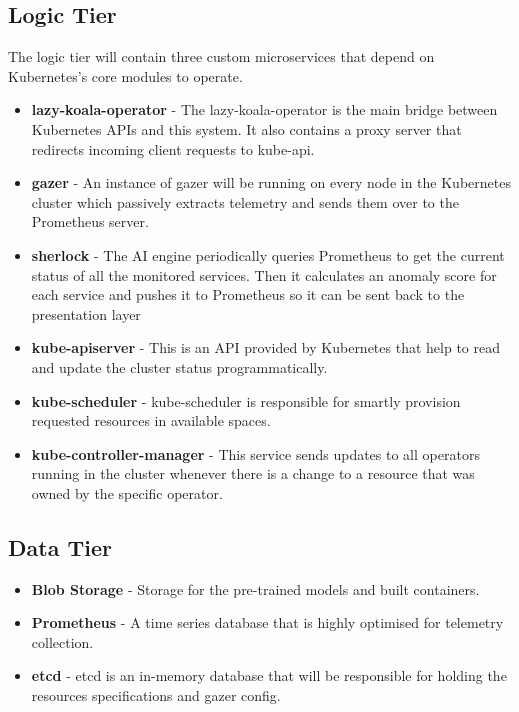 \subsection{Logic Tier}

The logic tier will contain three custom microservices that depend on Kubernetes's core modules to operate.

\begin{itemize}[noitemsep,nolistsep] 
    \item \textbf{\ac{lazy-koala-operator}} - The \ac{lazy-koala-operator} is the main bridge between Kubernetes APIs and this system. It also contains a proxy server that redirects incoming client requests to kube-api.
    \item \textbf{\ac{gazer}} - An instance of \ac{gazer} will be running on every node in the Kubernetes cluster which passively extracts telemetry and sends them over to the Prometheus server.
    \item \textbf{\ac{sherlock}} - The AI engine periodically queries Prometheus to get the current status of all the monitored services. Then it calculates an anomaly score for each service and pushes it to Prometheus so it can be sent back to the presentation layer
    \item \textbf{kube-apiserver} - This is an API provided by Kubernetes that help to read and update the cluster status programmatically.
    \item \textbf{kube-scheduler} - kube-scheduler is responsible for smartly provision requested resources in available spaces.
    \item \textbf{kube-controller-manager} - This service sends updates to all operators running in the cluster whenever there is a change to a resource that was owned by the specific operator.
\end{itemize}

\subsection{Data Tier}

\begin{itemize}[noitemsep,nolistsep] 
    \item \textbf{Blob Storage} - Storage for the pre-trained models and built containers.
    \item \textbf{Prometheus} - A time series database that is highly optimised for telemetry collection.
    \item \textbf{etcd} - etcd is an in-memory database that will be responsible for holding the resources specifications and \ac{gazer} config.
\end{itemize}